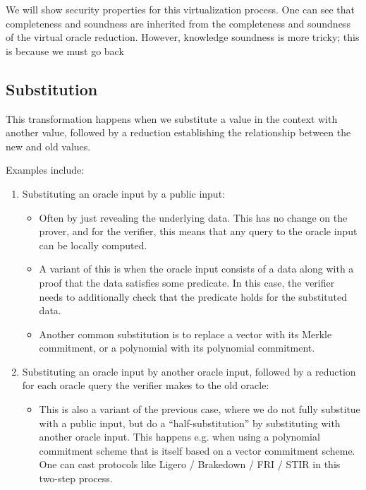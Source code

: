 We will show security properties for this virtualization process. One can see that completeness and soundness are inherited from the completeness and soundness of the virtual oracle reduction. However, knowledge soundness is more tricky; this is because we must go back 

\subsection{Substitution}

This transformation happens when we substitute a value in the context with another value, followed
by a reduction establishing the relationship between the new and old values.

Examples include:
\begin{enumerate}
    \item Substituting an oracle input by a public input:
    \begin{itemize}
        \item Often by just revealing the underlying data. This has no change on the prover, and for
        the verifier, this means that any query to the oracle input can be locally computed.
        \item A variant of this is when the oracle input consists of a data along with a proof that
        the data satisfies some predicate. In this case, the verifier needs to additionally check
        that the predicate holds for the substituted data.
        \item Another common substitution is to replace a vector with its Merkle commitment, or a
        polynomial with its polynomial commitment.
    \end{itemize}
    \item Substituting an oracle input by another oracle input, followed by a reduction for each
    oracle query the verifier makes to the old oracle:
    \begin{itemize}
        \item This is also a variant of the previous case, where we do not fully substitue with a
        public input, but do a ``half-substitution'' by substituting with another oracle input. This
        happens e.g. when using a polynomial commitment scheme that is itself based on a vector
        commitment scheme. One can cast protocols like Ligero / Brakedown / FRI / STIR in this
        two-step process.
    \end{itemize}
\end{enumerate}
